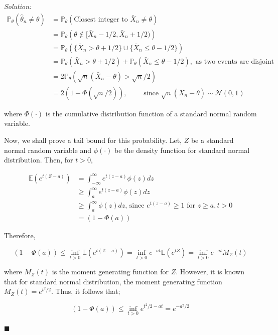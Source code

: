 \documentclass[12pt]{article}
\newcommand{\E}{\mathbb{E}}
\newcommand{\prob}{\mathbb{P}}
\newcommand{\normal}{\mathcal{N}}
\theoremstyle{definition}
\newenvironment{answer}{\textit{Solution: }\quad }{ \hfill $\blacksquare$}
\numberwithin{equation}{section}
\begin{document}
\begin{answer}
    \begin{align*}
        \prob_{\theta}(\widehat{\theta}_n \neq \theta)
        & = \prob_{\theta}\left( \text{Closest integer to } \bar{X}_n \neq \theta \right)\\
        & = \prob_{\theta} \left( \theta \notin [\bar{X}_n - 1/2, \bar{X}_n + 1/2) \right)\\
        & = \prob_{\theta} \left( \{ \bar{X}_n > \theta + 1/2 \} \cup \{ \bar{X}_n \leq \theta - 1/2 \}\right)\\
        & = \prob_{\theta} (\bar{X}_n > \theta + 1/2) + \prob_{\theta} (\bar{X}_n \leq \theta - 1/2), \text{ as two events are disjoint}\\
        & = 2 \prob_{\theta} (\sqrt{n}(\bar{X}_n - \theta) > \sqrt{n}/2 )\\
        & = 2 \left( 1 - \Phi(\sqrt{n}/2) \right), \qquad \text{ since } \sqrt{n}(\bar{X}_n - \theta) \sim \normal(0, 1)
    \end{align*}

    where $\Phi(\cdot)$ is the cumulative distribution function of a standard normal random variable.

    Now, we shall prove a tail bound for this probability. Let, $Z$ be a standard normal random variable and $\phi(\cdot)$ be the density function for standard normal distribution. Then, for $t > 0$,

    \begin{align*}
        \E(e^{t(Z - a)}) & = \int_{-\infty}^{\infty} e^{t(z - a)} \phi(z)dz\\
        & \geq \int_{a}^{\infty} e^{t(z - a)} \phi(z)dz\\
        & \geq \int_{a}^{\infty} \phi(z)dz \text{, since } e^{t(z-a)} \geq 1 \text{ for } z \geq a, t > 0\\
        & = (1 - \Phi(a))
    \end{align*}

    Therefore, 

    $$
    (1 - \Phi(a)) \leq \inf_{t > 0} \E(e^{t(Z - a)}) = \inf_{t > 0} e^{-at} \E(e^{tZ}) = \inf_{t > 0} e^{-at} M_Z(t)
    $$

    where $M_Z(t)$ is the moment generating function for $Z$. However, it is known that for standard normal distribution, the moment generating function $M_Z(t) = e^{t^2/2}$. Thus, it follows that;


    \begin{equation}
        (1 - \Phi(a)) \leq \inf_{t > 0} e^{t^2/2 - at} = e^{-a^2/2}
        \label{eqn:9-1}        
    \end{equation}


\end{answer}
\end{document}
